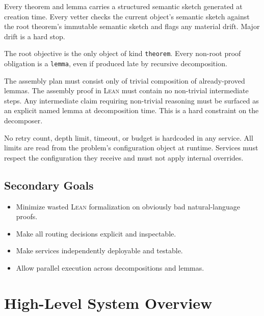 \documentclass[11pt,a4paper]{article}
\newcommand{\Lean}{\textsc{Lean}}
\begin{document}
\begin{policybox}
Every theorem and lemma carries a structured semantic sketch generated at creation time. Every vetter checks the current object's semantic sketch against the root theorem's immutable semantic sketch and flags any material drift. Major drift is a hard stop.
\end{policybox}

\begin{policybox}
The root objective is the only object of kind \texttt{theorem}. Every non-root proof obligation is a \texttt{lemma}, even if produced late by recursive decomposition.
\end{policybox}

\begin{policybox}
The assembly plan must consist only of trivial composition of already-proved lemmas. The assembly proof in \Lean{} must contain no non-trivial intermediate steps. Any intermediate claim requiring non-trivial reasoning must be surfaced as an explicit named lemma at decomposition time. This is a hard constraint on the decomposer.
\end{policybox}

\begin{policybox}
No retry count, depth limit, timeout, or budget is hardcoded in any service. All limits are read from the problem's configuration object at runtime. Services must respect the configuration they receive and must not apply internal overrides.
\end{policybox}

\subsection{Secondary Goals}
\begin{itemize}[leftmargin=2em]
  \item Minimize wasted \Lean{} formalization on obviously bad natural-language proofs.
  \item Make all routing decisions explicit and inspectable.
  \item Make services independently deployable and testable.
  \item Allow parallel execution across decompositions and lemmas.
\end{itemize}

\section{High-Level System Overview}
\end{document}
